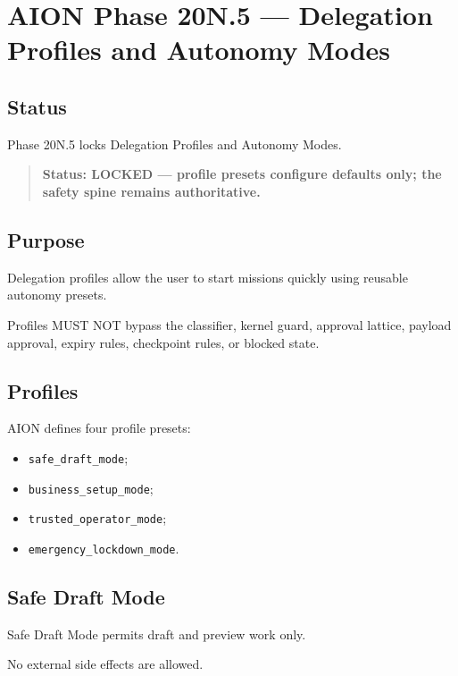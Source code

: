 \section{AION Phase 20N.5 --- Delegation Profiles and Autonomy Modes}
\label{sec:aion-phase20n5-delegation-profiles-autonomy-modes}

\subsection{Status}

Phase 20N.5 locks Delegation Profiles and Autonomy Modes.

\begin{quote}
\textbf{Status: LOCKED --- profile presets configure defaults only; the safety spine remains authoritative.}
\end{quote}

\subsection{Purpose}

Delegation profiles allow the user to start missions quickly using reusable autonomy presets.

Profiles MUST NOT bypass the classifier, kernel guard, approval lattice, payload approval, expiry rules, checkpoint rules, or blocked state.

\subsection{Profiles}

AION defines four profile presets:

\begin{itemize}
  \item \texttt{safe\_draft\_mode};
  \item \texttt{business\_setup\_mode};
  \item \texttt{trusted\_operator\_mode};
  \item \texttt{emergency\_lockdown\_mode}.
\end{itemize}

\subsection{Safe Draft Mode}

Safe Draft Mode permits draft and preview work only.

No external side effects are allowed.


